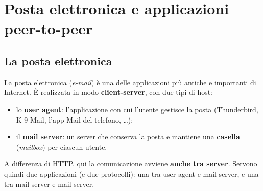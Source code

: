 \chapter{Posta elettronica e applicazioni peer-to-peer}

\section{La posta elettronica}

La posta elettronica (\emph{e-mail}) è una delle applicazioni più antiche e importanti di Internet.
È realizzata in modo \textbf{client-server}, con due tipi di host:

\begin{itemize}
    \item lo \textbf{user agent}: l'applicazione con cui l'utente gestisce la posta (Thunderbird, K-9 Mail,
          l'app Mail del telefono, \dots);
    \item il \textbf{mail server}: un server che conserva la posta e mantiene una \textbf{casella}
          (\emph{mailbox}) per ciascun utente.
\end{itemize}

A differenza di HTTP, qui la comunicazione avviene \textbf{anche tra server}. Servono quindi due
applicazioni (e due protocolli): una tra user agent e mail server, e una tra mail server e mail server.

